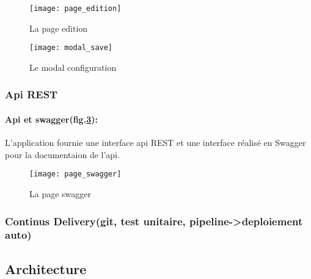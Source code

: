 \begin{figure}[h]
\centering
\texttt{[image: page\_edition]}
\caption{La page edition}
\label{fig:page_edition}
\end{figure}

\begin{figure}[h]
\centering
\texttt{[image: modal\_save]}
\caption{Le modal configuration}
\label{fig:modal_save}
\end{figure}

\subsubsection{Api REST}

\paragraph{Api et swagger(fig.\ref{fig:page_swagger}):  } L'application fournie une interface api REST et une interface réalisé en Swagger pour la documentaion de l'api.

\begin{figure}[h]
\centering
\texttt{[image: page\_swagger]}
\caption{La page swagger}
\label{fig:page_swagger}
\end{figure}

\subsubsection{Continus Delivery(git, test unitaire, pipeline->deploiement auto)}

\subsection{Architecture}
